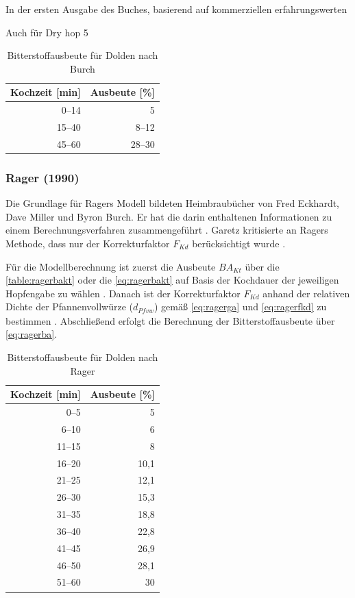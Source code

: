 \documentclass[a4paper,parskip=half]{scrartcl}
\newcommand{\BAKt}{{\mathit{BA}}_{\mathit{Kt}}}
\newcommand{\FKd}{F_{\mathit{Kd}}}
\newcommand{\dPfvw}{d_\mathit{Pfvw}}
\begin{document}
In der ersten Ausgabe des Buches, basierend auf kommerziellen erfahrungswerten \parencite[28-32]{Burch1992}

Auch für Dry hop 5 \parencite[33]{Burch1992}

\begin{table}[H]
\centering
\begin{tabular}{rr}
\toprule
\multicolumn{1}{c}{\textbf{Kochzeit [min]}} & \multicolumn{1}{c}{\textbf{Ausbeute [\%]}} \\
\midrule
0–14  & 5 \\
15–40 & 8–12 \\
45–60 & 28–30 \\
\bottomrule
\end{tabular}
\caption{Bitterstoffausbeute für Dolden nach Burch \parencite[33]{Burch1992}}
\label{table:burchbakt}
\end{table}

\subsubsection*{Rager (1990)}

Die Grundlage für Ragers Modell bildeten Heimbraubücher von Fred Eckhardt,
Dave Miller und Byron Burch. Er hat die darin enthaltenen Informationen
zu einem Berechnungsverfahren zusammengeführt \parencite[53]{Rager1990}. 
Garetz kritisierte an Ragers Methode, dass nur der Korrekturfaktor
$\FKd$ berücksichtigt wurde \parencite[134]{Garetz1994}.

Für die Modellberechnung ist zuerst die Ausbeute $\BAKt$ über die \autoref{table:ragerbakt}
oder die \autoref{eq:ragerbakt} auf Basis der Kochdauer der jeweiligen Hopfengabe
zu wählen \parencite{Steinmeyer2021}.
Danach ist der Korrekturfaktor $\FKd$ anhand der relativen Dichte der
Pfannenvollwürze ($\dPfvw$) gemäß \autoref{eq:ragerga} und \autoref{eq:ragerfkd}
zu bestimmen \parencite[53]{Rager1990}.
Abschließend erfolgt die Berechnung der Bitterstoffausbeute über \autoref{eq:ragerba}.

\begin{table}[H]
\centering
\begin{tabular}{rr}
\toprule
\multicolumn{1}{c}{\textbf{Kochzeit [min]}} & \multicolumn{1}{c}{\textbf{Ausbeute [\%]}} \\
\midrule
0–5             & 5 \\
6–10            & 6 \\
11–15           & 8 \\
16–20           & 10,1 \\
21–25           & 12,1 \\
26–30           & 15,3 \\
31–35           & 18,8 \\
36–40           & 22,8 \\
41–45           & 26,9 \\
46–50           & 28,1 \\
51–60           & 30 \\
\bottomrule
\end{tabular}
\caption{Bitterstoffausbeute für Dolden nach Rager \parencite[54]{Rager1990}}
\label{table:ragerbakt}
\end{table}
\end{document}
